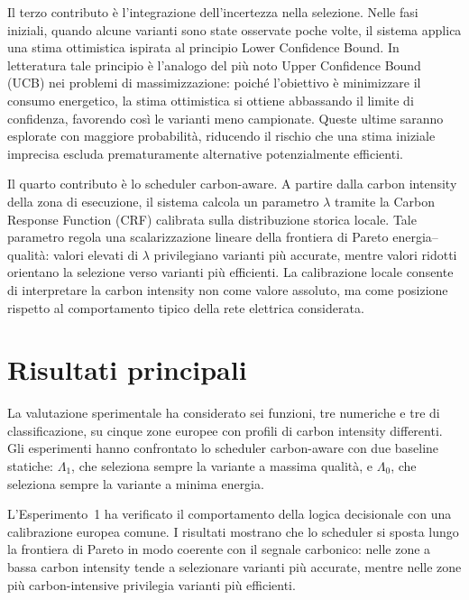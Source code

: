 Il terzo contributo è l'integrazione dell'incertezza nella selezione. Nelle
fasi iniziali, quando alcune varianti sono state osservate poche volte, il
sistema applica una stima ottimistica ispirata al principio Lower Confidence
Bound. In letteratura tale principio è l'analogo del più noto Upper
Confidence Bound (UCB) nei problemi di massimizzazione: poiché l'obiettivo
è minimizzare il consumo energetico, la stima ottimistica si ottiene
abbassando il limite di confidenza, favorendo così le varianti meno
campionate. Queste ultime saranno esplorate con maggiore
probabilità, riducendo il rischio che una stima iniziale imprecisa escluda
prematuramente alternative potenzialmente efficienti.

Il quarto contributo è lo scheduler carbon-aware. A partire dalla carbon
intensity della zona di esecuzione, il sistema calcola un parametro
$\lambda$ tramite la Carbon Response Function (CRF) calibrata sulla distribuzione
storica locale. Tale parametro regola una scalarizzazione lineare della
frontiera di Pareto energia--qualità: valori elevati di $\lambda$
privilegiano varianti più accurate, mentre valori ridotti orientano la
selezione verso varianti più efficienti. La calibrazione locale consente di
interpretare la carbon intensity non come valore assoluto, ma come
posizione rispetto al comportamento tipico della rete elettrica considerata.

\section{Risultati principali}

La valutazione sperimentale ha considerato sei funzioni, tre numeriche e
tre di classificazione, su cinque zone europee con profili di carbon
intensity differenti. Gli esperimenti hanno confrontato lo scheduler
carbon-aware con due baseline statiche: $\Lambda_1$, che seleziona sempre
la variante a massima qualità, e $\Lambda_0$, che seleziona sempre la
variante a minima energia.

L'Esperimento~1 ha verificato il comportamento della logica decisionale con
una calibrazione europea comune. I risultati mostrano che lo scheduler si
sposta lungo la frontiera di Pareto in modo coerente con il segnale
carbonico: nelle zone a bassa carbon intensity tende a selezionare varianti
più accurate, mentre nelle zone più carbon-intensive privilegia varianti
più efficienti.

